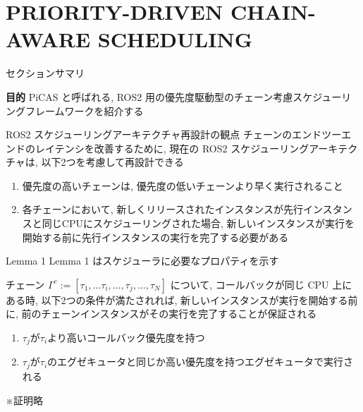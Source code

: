 
\section{PRIORITY-DRIVEN CHAIN-AWARE SCHEDULING}
\label{sec: priority-driven chain-aware scheduling}

\begin{frame}{セクションサマリ}
    \begin{itembox}[l]{\textbf{目的}}
        PiCAS と呼ばれる, ROS2 用の優先度駆動型のチェーン考慮スケジューリングフレームワークを紹介する
    \end{itembox}
\end{frame}

\begin{frame}{ROS2 スケジューリングアーキテクチャ再設計の観点}
    チェーンのエンドツーエンドのレイテンシを改善するために, 現在の ROS2 スケジューリングアーキテクチャは, 以下2つを考慮して再設計できる
    \begin{enumerate}
        \item 優先度の高いチェーンは, 優先度の低いチェーンより早く実行されること
        \item 各チェーンにおいて, 新しくリリースされたインスタンスが先行インスタンスと同じCPUにスケジューリングされた場合, 新しいインスタンスが実行を開始する前に先行インスタンスの実行を完了する必要がある
    \end{enumerate}
\end{frame}

\begin{frame}[label=lemma1]{Lemma 1}
    Lemma 1 はスケジューラに必要なプロパティを示す
    \begin{lemma}[]
        チェーン $\Gamma^{c}:=\left[\tau_{1}, \ldots \tau_{i}, \ldots, \tau_{j}, \ldots, \tau_{N}\right]$ について, コールバックが同じ CPU 上にある時, 以下2つの条件が満たされれば, 新しいインスタンスが実行を開始する前に, 前のチェーンインスタンスがその実行を完了することが保証される
        \begin{enumerate}
            \item $\tau_{j}$が$\tau_{i}$より高いコールバック優先度を持つ
            \item $\tau_{j}$が$\tau_{i}$のエグゼキュータと同じか高い優先度を持つエグゼキュータで実行される
        \end{enumerate}
    \end{lemma}
    ※証明略
\end{frame}

